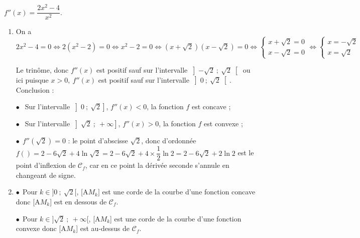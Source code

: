 \begin{enumerate}
$f''(x) = \dfrac{2x^2 - 4}{x^2}$.

	\begin{enumerate}
		\item %
		
On a $2x^2 - 4 = 0 \iff 2\left(x^2 - 2 \right) = 0 \iff x^2 - 2 = 0 \iff \left(x + \sqrt 2 \right)\left(x - \sqrt 2 \right) = 0 \iff \left\{\begin{array}{l}x + \sqrt 2 = 0\\x - \sqrt 2= 0
\end{array}\right. \iff \left\{\begin{array}{l}x  = -  \sqrt 2\\x = \sqrt 2
\end{array}\right.$

Le trinôme, donc $f''(x)$ est positif sauf sur l'intervalle $\left]-\sqrt 2~;~\sqrt{2}\right[$ ou ici puisque $x > 0, \: f''(x)$ est positif sauf sur l'intervalle $\left]0~;~\sqrt{2}\right[$. Conclusion :

$\bullet~~$ Sur l'intervalle $\left]0~;~\sqrt 2\right]$, $f''(x) < 0$, la fonction $f$ est concave ;

$\bullet~~$ Sur l'intervalle $\left]\sqrt 2~;~+ \infty\right]$, $f''(x) > 0$, la fonction $f$ est convexe ;

$\bullet~~$$f''\left(\sqrt 2\right) = 0$ : le point d'abscisse $\sqrt 2$, donc d'ordonnée $f\left( \right) = 2 - 6\sqrt 2 + 4 \ln \sqrt 2 = 2 - 6\sqrt 2 + 4 \times \dfrac12\ln 2 = 2 - 6\sqrt 2 + 2\ln 2$ est le point d'inflexion de $\mathcal{C}_f$, car en ce point la dérivée seconde s'annule en changeant de signe.
		\item %
		

$\bullet~~$Pour $k \in  ]0~;~\sqrt 2[$, [A$M_k]$ est une corde de la courbe d'une fonction concave donc [A$M_k$] est en dessous de $\mathcal{C}_f$.

$\bullet~~$Pour $k \in ]\sqrt 2~;~ +\infty[$, [A$M_k$] est une corde de la courbe d'une fonction convexe donc [A$M_k$] est au-dessus de $\mathcal{C}_f$.
	\end{enumerate}
\end{enumerate}

\bigskip

